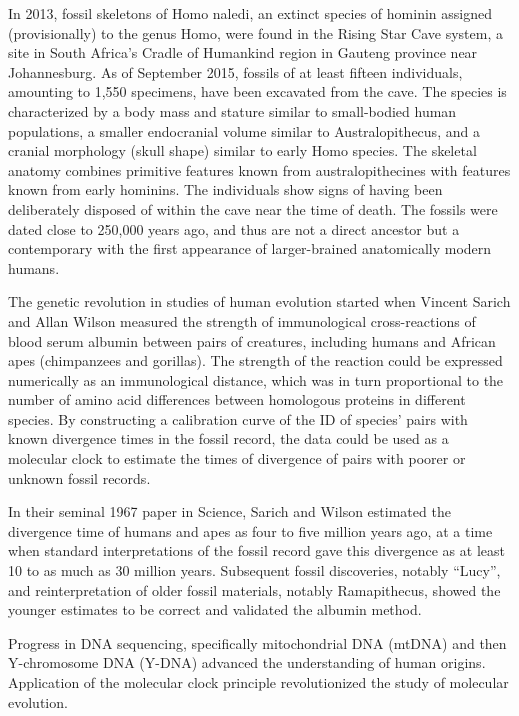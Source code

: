 In 2013, fossil skeletons of Homo naledi, an extinct species of hominin assigned (provisionally) to the genus Homo, were found in the Rising Star Cave system, a site in South Africa's Cradle of Humankind region in Gauteng province near Johannesburg. As of September 2015, fossils of at least fifteen individuals, amounting to 1,550 specimens, have been excavated from the cave. The species is characterized by a body mass and stature similar to small-bodied human populations, a smaller endocranial volume similar to Australopithecus, and a cranial morphology (skull shape) similar to early Homo species. The skeletal anatomy combines primitive features known from australopithecines with features known from early hominins. The individuals show signs of having been deliberately disposed of within the cave near the time of death. The fossils were dated close to 250,000 years ago, and thus are not a direct ancestor but a contemporary with the first appearance of larger-brained anatomically modern humans.

The genetic revolution in studies of human evolution started when Vincent Sarich and Allan Wilson measured the strength of immunological cross-reactions of blood serum albumin between pairs of creatures, including humans and African apes (chimpanzees and gorillas). The strength of the reaction could be expressed numerically as an immunological distance, which was in turn proportional to the number of amino acid differences between homologous proteins in different species. By constructing a calibration curve of the ID of species' pairs with known divergence times in the fossil record, the data could be used as a molecular clock to estimate the times of divergence of pairs with poorer or unknown fossil records.

In their seminal 1967 paper in Science, Sarich and Wilson estimated the divergence time of humans and apes as four to five million years ago, at a time when standard interpretations of the fossil record gave this divergence as at least 10 to as much as 30 million years. Subsequent fossil discoveries, notably ``Lucy'', and reinterpretation of older fossil materials, notably Ramapithecus, showed the younger estimates to be correct and validated the albumin method.

Progress in DNA sequencing, specifically mitochondrial DNA (mtDNA) and then Y-chromosome DNA (Y-DNA) advanced the understanding of human origins. Application of the molecular clock principle revolutionized the study of molecular evolution.

